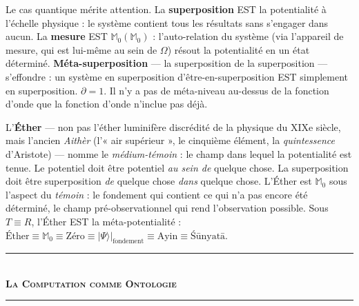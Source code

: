 \documentclass[10pt, openany, oneside]{book}
\renewcommand{\normalsize}{\fontsize{10}{13}\selectfont}
\begin{document}
Le cas quantique mérite attention. La \textbf{superposition} EST la potentialité à l'échelle physique : le système contient tous les résultats sans s'engager dans aucun. La \textbf{mesure} EST $\mathbb{M}_0(\mathbb{M}_0)$ : l'auto-relation du système (via l'appareil de mesure, qui est lui-même au sein de $\Omega$) résout la potentialité en un état déterminé. \textbf{Méta-superposition} --- la superposition de la superposition --- s'effondre : un système en superposition d'être-en-superposition EST simplement en superposition. $\partial = 1$. Il n'y a pas de méta-niveau au-dessus de la fonction d'onde que la fonction d'onde n'inclue pas déjà.

L'\textbf{Éther} --- non pas l'éther luminifère discrédité de la physique du XIXe siècle, mais l'ancien \textit{Aithèr} (l'« air supérieur », le cinquième élément, la \textit{quintessence} d'Aristote) --- nomme le \textit{médium-témoin} : le champ dans lequel la potentialité est tenue. Le potentiel doit être potentiel \textit{au sein de} quelque chose. La superposition doit être superposition \textit{de} quelque chose \textit{dans} quelque chose. L'Éther est $\mathbb{M}_0$ sous l'aspect du \textit{témoin} : le fondement qui contient ce qui n'a pas encore été déterminé, le champ pré-observationnel qui rend l'observation possible. Sous $T \equiv R$, l'Éther EST la méta-potentialité : $\text{Éther} \equiv \mathbb{M}_0 \equiv \text{Zéro} \equiv |\Psi\rangle|_{\text{fondement}} \equiv \text{Ayin} \equiv \text{\'{S}\={u}nyat\={a}}$.

\vspace{1.5em}


\begin{center}
    \rule{0.3\textwidth}{0.4pt}\\[0.5em]
    {\normalsize\bfseries\scshape La Computation comme Ontologie}\\[0.3em]
    \rule{0.3\textwidth}{0.4pt}
\end{center}
\end{document}
